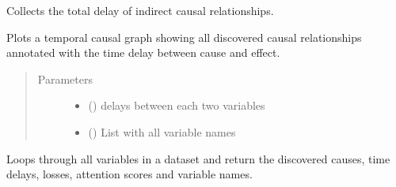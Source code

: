 \documentclass[letterpaper,10pt,english]{sphinxmanual}
\begin{document}
\begin{fulllineitems}
\begin{fulllineitems}
\end{fulllineitems}


\begin{fulllineitems}
\label{\detokenize{causations:causations.Causations.getextendeddelays}}
\sphinxAtStartPar
Collects the total delay of indirect causal relationships.

\end{fulllineitems}


\begin{fulllineitems}
\label{\detokenize{causations:causations.Causations.plotgraph}}
\sphinxAtStartPar
Plots a temporal causal graph showing all discovered causal relationships annotated with the time delay between cause and effect.
\begin{quote}\begin{description}
\item[{Parameters}] \leavevmode\begin{itemize}
\item {} 
\sphinxAtStartPar
{} () \textendash{} delays between each two variables

\item {} 
\sphinxAtStartPar
{} () \textendash{} List with all variable names

\end{itemize}

\end{description}\end{quote}

\end{fulllineitems}


\begin{fulllineitems}
\label{\detokenize{causations:causations.Causations.runTCDF}}
\sphinxAtStartPar
Loops through all variables in a dataset and return the discovered causes, time delays, losses, attention scores and variable names.

\end{fulllineitems}


\end{fulllineitems}
\end{document}
